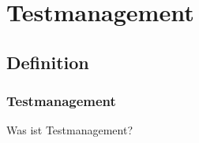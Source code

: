 \section{Testmanagement}

\subsection{Definition}
\begin{frame}
	\frametitle{Testmanagement}
	Was ist Testmanagement?
\end{frame}

